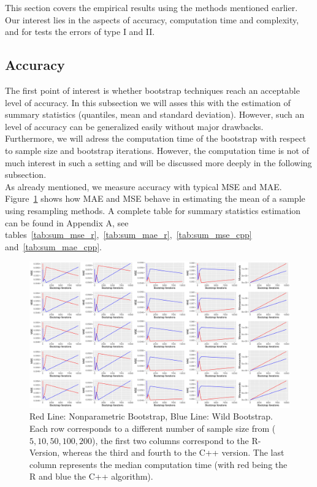 This section covers the empirical results using the methods mentioned earlier. Our interest lies in the aspects of accuracy, computation time and complexity, and for tests the errors of type I and II. 
\subsection{Accuracy}
The first point of interest is whether bootstrap techniques reach an acceptable level of accuracy. In this subsection we will asses this with the estimation of summary statistics (quantiles, mean and standard deviation). However, such an level of accuracy can be generalized easily without major drawbacks. Furthermore, we will adress the computation time of the bootstrap with respect to sample size and bootstrap iterations. However, the computation time is not of much interest in such a setting and will be discussed more deeply in the following subsection. \\
As already mentioned, we measure accuracy with typical MSE and MAE. Figure~\ref{fig:summary} shows how MAE and MSE behave in estimating the mean of a sample using resampling methods. A complete table for summary statistics estimation can be found in Appendix A, see tables~\ref{tab:sum_mse_r},~\ref{tab:sum_mae_r},~\ref{tab:sum_mse_cpp} and~\ref{tab:sum_mae_cpp}. 

\begin{figure}
\centering
	\includegraphics[scale=0.4]{./figures/plot_summary.pdf}
	\caption[Summary MSE and MAE]{Red Line: Nonparametric Bootstrap, Blue Line: Wild Bootstrap. Each row corresponds to a different number of sample size from ($5, 10, 50, 100, 200$), the first two columns correspond to the R-Version, whereas the third and fourth to the C++ version. The last column represents the median computation time (with red being the R and blue the C++ algorithm).}
	\label{fig:summary}
\end{figure}

